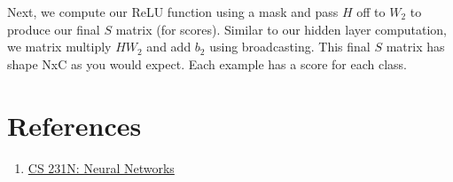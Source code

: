 \documentclass[12pt]{article}
\begin{document}
Next, we compute our ReLU function using a mask and pass $H$ off to $W_2$ to produce 
our final $S$ matrix (for scores). Similar to our hidden layer computation, we matrix multiply
$HW_2$ and add $b_2$ using broadcasting. This final $S$ matrix has shape NxC as you would 
expect. Each example has a score for each class. 

\paragraph{}


\section{References}
\begin{enumerate}
    \item \href{https://cs231n.github.io/neural-networks-1/}{CS 231N: Neural Networks}
\end{enumerate}
\end{document}
